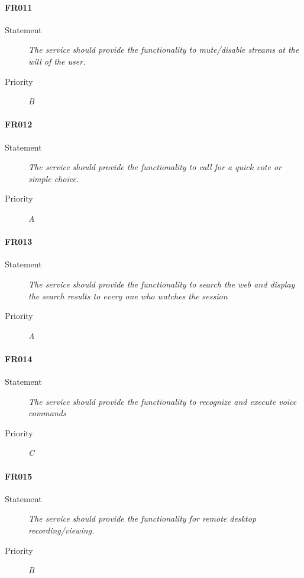 \paragraph{FR011}
\begin{description}
  \item [Statement] 
    \textit{The service should provide the functionality to mute/disable streams at the will of the user.}
  \item [Priority] \textit{B}
\end{description}

\paragraph{FR012}
\begin{description}
  \item [Statement] 
    \textit{The service should provide the functionality to call for a quick vote or simple choice.}
  \item [Priority] \textit{A}
\end{description}

\paragraph{FR013}
\begin{description}
  \item [Statement] 
    \textit{The service should provide the functionality to search the web and display the search results to every one who watches the session}
  \item [Priority] \textit{A}
\end{description}

\paragraph{FR014}
\begin{description}
  \item [Statement] 
    \textit{The service should provide the functionality to recognize and execute voice commands}
  \item [Priority] \textit{C}
\end{description}

\paragraph{FR015}
\begin{description}
  \item [Statement] 
    \textit{The service should provide the functionality for remote desktop recording/viewing.}
  \item [Priority] \textit{B}
\end{description}


